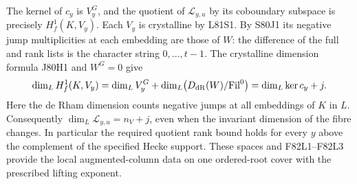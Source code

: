 The kernel of $c_y$ is $V_y^G$, and the quotient of
$\mathcal L_{y,u}$ by its coboundary subspace is precisely
$H^1_f(K,V_y)$. Each $V_y$ is crystalline by L81S1. By S80J1
its negative jump multiplicities at each embedding are those of
$W$: the difference of the full and rank lists is the character
string $0,\ldots,t-1$. The crystalline dimension formula J80H1
and $W^G=0$ give
\[
 \dim_L H^1_f(K,V_y)
 =\dim_L V_y^G+\dim_L\bigl(D_{\rm dR}(W)/\mathrm{Fil}^0\bigr)
 =\dim_L\ker c_y+j .
\]
Here the de Rham dimension counts negative jumps at all embeddings
of $K$ in $L$. Consequently $\dim_L\mathcal L_{y,u}=n_V+j$,
even when the invariant dimension of the fibre changes.
In particular the required quotient rank bound holds for every
$y$ above the complement of the specified Hecke support. These
spaces and F82L1--F82L3 provide the local augmented-column data
on one ordered-root cover with the prescribed lifting exponent.
